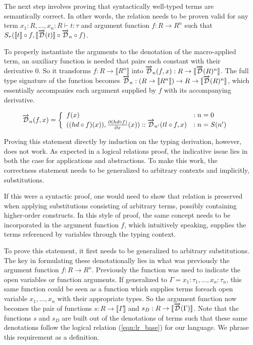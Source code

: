 \documentclass[11pt, final]{article}
\begin{document}
  The next step involves proving that syntactically well-typed terms are semantically correct.
  In other words, the relation needs to be proven valid for any term $x_1 : R, \dots, x_n : R \vdash t : \tau$ and argument function $f : R \rightarrow R^n$ such that $S_\tau(\llbracket t \rrbracket \circ f, \llbracket \overrightarrow{\mathcal{D}}(t) \rrbracket \circ \overrightarrow{\mathcal{D}}_n \circ f)$.

  To properly instantiate the arguments to the denotation of the macro-applied term, an auxiliary function is needed that pairs each constant with their derivative $0$. So it transforms $f : R \rightarrow \llbracket R^n \rrbracket$ into $\overrightarrow{\mathcal{D}}_n(f, x) : R \rightarrow \llbracket \overrightarrow{\mathcal{D}}(R)^n \rrbracket$.
  The full type signature of the function becomes $\overrightarrow{\mathcal{D}}_n : (R \rightarrow \llbracket R^n \rrbracket) \rightarrow R \rightarrow \llbracket \overrightarrow{\mathcal{D}}(R)^n \rrbracket$, which essentially accompanies each argument supplied by $f$ with its accompanying derivative.

  \begin{equation}
    \overrightarrow{\mathcal{D}}_n(f, x) =
      \left\{
        \begin{array}{ll}
          f(x) & : n = 0 \\
          ((hd \circ f)(x)), \frac{\partial{(hd \circ f)}}{\partial{x}}(x)) :: \overrightarrow{\mathcal{D}}_{n'}(tl \circ f, x) & : n = S(n') \\
        \end{array}
      \right.
  \label{eqn:argument_df}
  \end{equation}

  Proving this statement directly by induction on the typing derivation, however, does not work.
  As expected in a logical relations proof, the indicative issue lies in both the case for applications and abstractions.
  To make this work, the correctness statement needs to be generalized to arbitrary contexts and implicitly, substitutions.

  If this were a syntactic proof, one would need to show that relation is preserved when applying substitutions consisting of arbitrary terms, possibly containing higher-order constructs.
  In this style of proof, the same concept needs to be incorporated in the argument function $f$, which intuitively speaking, supplies the terms referenced by variables through the typing context.


  To prove this statement, it first needs to be generalized to arbitrary substitutions.
  The key in formulating these denotationally lies in what was previously the argument function $f : R \rightarrow R^n$.
  Previously the function was used to indicate the open variables or function arguments.
  If generalized to $\Gamma = x_1 : \tau_1, \dots, x_n : \tau_n$, this same function could be seen as a function which supplies terms foreach open variable $x_1, \dots, x_n$ with their appropriate types.
  So the argument function now becomes the pair of functions $s : R \rightarrow \llbracket \Gamma \rrbracket$ and $s_D : R \rightarrow \llbracket \overrightarrow{\mathcal{D}}(\Gamma) \rrbracket$.
  Note that the functions $s$ and $s_D$ are built out of the denotations of terms such that these same denotations follow the logical relation (\ref{eqn:lr_base}) for our language.
  We phrase this requirement as a definition.
\end{document}
